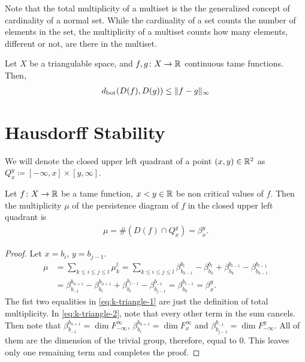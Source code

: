 Note that the total multiplicity of a multiset is the the generalized concept of cardinality of a normal set. While the cardinality of a set counts the number of elements in the set, the multiplicity of a multiset counts how many elements, different or not, are there in the multiset.

\begin{theorem} \label{lemma:edelsbrunner-stability}
    Let $ X $ be a triangulable space, and $ f, g\colon X \to \mathbb R $ continuous tame functions. Then,
    \begin{align}
        d_{\operatorname{bot}} (D(f), D(g)) \leq \|f-g\|_\infty
    \end{align}
\end{theorem}

\section{Hausdorff Stability}

We will denote the closed upper left quadrant of a point $ (x, y) \in \mathbb R^2 $ as $ Q_x^y \coloneq [-\infty, x] \times [y, \infty] $.

\begin{lemma} \label{lemma:k-triangle}
    Let $ f\colon X \to \mathbb R $ be a tame function, $ x < y \in \mathbb R $ be non critical values of $ f $. Then the multiplicity $\mu $ of the persistence diagram of $ f $ in the closed upper left quadrant is 
    \begin{align}
        \mu = \# (D(f) \cap Q_x^y) = \beta_x^y.
    \end{align}
\end{lemma}
\begin{proof}
    Let $ x = b_i $, $ y = b_{j-1} $.
    \begin{align} 
        \mu &= \sum_{k \leq i \leq j \leq l} \mu_k^l = \sum_{k \leq i \leq j \leq l} \beta_{b_{k-1}}^{b_l} - \beta_{b_k}^{b_l} + \beta_{b_k}^{b_{l-1}} - \beta_{b_{k-1}}^{b_{l-1}} \label{eq:k-triangle-1} \\
        &= \beta_{b_{-1}}^{b_{n+1}} - \beta_{b_i}^{b_{n+1}} + \beta_{b_i}^{b_{j-1}} - \beta_{b_{j-1}}^{b_{-1}} = \beta_{b_k}^{b_{l-1}} = \beta_x^y. \label{eq:k-triangle-2}
    \end{align}
    The fist two equalities in \eqref{eq:k-triangle-1} are just the definition of total multiplicity. In \eqref{eq:k-triangle-2}, note that every other term in the sum cancels. Then note that $ \beta_{b_{-1}}^{b_{n+1}} = \dim F_{-\infty}^{\infty} $, $ \beta_{b_i}^{b_{n+1}} = \dim F_{x}^{\infty} $ and $ \beta_{b_{j-1}}^{b_{-1}} = \dim F_{-\infty}^y $. All of them are the dimension of the trivial group, therefore, equal to $ 0 $. This leaves only one remaining term and completes the proof.
\end{proof}

